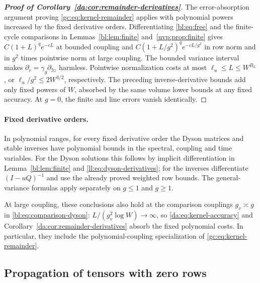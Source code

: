 \documentclass[11pt]{article}
\numberwithin{equation}{section}
\theoremstyle{remark}
\begin{document}
\begin{proof}[\textbf{Proof of Corollary~\ref{da:cor:remainder-derivatives}}]
The error-absorption argument proving \eqref{gc:eq:kernel-remainder}
applies with polynomial powers increased by the fixed derivative orders.
Differentiating \eqref{bl:eq:free} and the finite-cycle comparisons in
Lemmas~\ref{bl:lem:finite} and~\ref{uvp:prop:finite} gives
$C(1+L)^q e^{-cL}$ at bounded coupling and
$C(1+L/g^2)^q e^{-cL/g^2}$ in row norm and in $g^2$ times
pointwise norm at large coupling.
The bounded variance interval makes
$\partial_r=\gamma_g\partial_{\Im z}$ harmless.
Pointwise normalization costs at most $\ell_u\le L\le W^{B_L}$,
or $\ell_u/g^2\le2W^{3/2}$, respectively.
The preceding inverse-derivative bounds add only fixed powers of $W$,
absorbed by the same volume lower bounds at any fixed accuracy.
At $g=0$, the finite and line errors vanish identically.
\end{proof}

\paragraph{Fixed derivative orders.}
In polynomial ranges, for every fixed derivative order the Dyson
matrices and stable inverses have polynomial bounds in the spectral,
coupling and time variables. For the Dyson solutions this follows
by implicit differentiation in Lemma~\ref{bl:lem:finite} and
\eqref{ll:eq:dyson-derivatives}; for the inverses differentiate
$(I-uQ)^{-1}$ and use the already proved weighted row bounds.
The general-variance formulas apply separately on $g\le1$ and $g\ge1$.

At large coupling, these conclusions also hold at the comparison couplings $g_v\asymp g$
in \eqref{bl:eq:comparison-dyson}: $L/(g_v^2\log W)\to\infty$, so
\eqref{da:eq:kernel-accuracy} and
Corollary~\ref{da:cor:remainder-derivatives} absorb the fixed polynomial
costs. In particular, they include the polynomial-coupling specialization
of \eqref{gc:eq:kernel-remainder}.

\subsection{Propagation of tensors with zero rows}
\label{sec:gc-projected}
\end{document}
